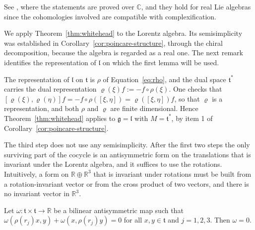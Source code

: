 	\noindent See \cite[TODO-location]{TODO-Hum10}, where the statements are proved over $\mathbb{C}$, and they hold for real Lie algebras since the cohomologies involved are compatible with complexification.
	
	We apply Theorem~\ref{thm:whitehead} to the Lorentz algebra. Its semisimplicity was established in Corollary~\ref{cor:poincare-structure}, through the chiral decomposition, because the algebra is regarded as a real one. The next remark identifies the representation of $\mathfrak{l}$ on which the first lemma will be used.
	
	\begin{remark}\label{rem:lorentz-semisimple}
		The representation of $\mathfrak{l}$ on $\mathfrak{t}$ is $\rho$ of Equation~\eqref{eq:rho}, and the dual space $\mathfrak{t}^*$ carries the dual representation $\varrho(\xi)f:=-f\circ\rho(\xi)$. One checks that $[\varrho(\xi),\varrho(\eta)]f=-f\circ\rho([\xi,\eta])=\varrho([\xi,\eta])f$, so that $\varrho$ is a representation, and both $\rho$ and $\varrho$ are finite dimensional. Hence Theorem~\ref{thm:whitehead} applies to $\mathfrak{g}=\mathfrak{l}$ with $M=\mathfrak{t}^*$, by item 1 of Corollary~\ref{cor:poincare-structure}.
	\end{remark}
	
	The third step does not use any semisimplicity. After the first two steps the only surviving part of the cocycle is an antisymmetric form on the translations that is invariant under the Lorentz algebra, and it suffices to use the rotations. Intuitively, a form on $\mathbb{R}\oplus\mathbb{R}^3$ that is invariant under rotations must be built from a rotation-invariant vector or from the cross product of two vectors, and there is no invariant vector in $\mathbb{R}^3$.
	
	\begin{lemma}\label{lem:rotation-invariant}
		Let $\omega:\mathfrak{t}\times\mathfrak{t}\to\mathbb{R}$ be a bilinear antisymmetric map such that $\omega(\rho(r_j)x,y)+\omega(x,\rho(r_j)y)=0$ for all $x,y\in\mathfrak{t}$ and $j=1,2,3$. Then $\omega=0$.
	\end{lemma}
	
